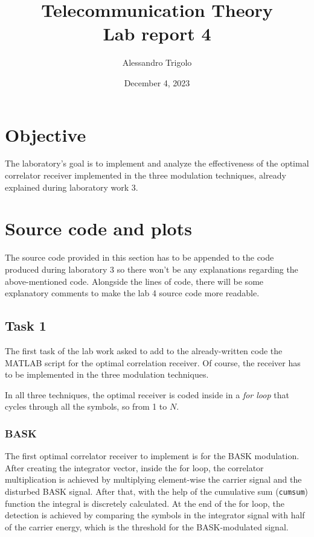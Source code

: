 \title{\vspace{160px} \textbf{\huge{Telecommunication Theory}} \\\vspace{17.5px} \LARGE{Lab report 4}  \vspace{10px}}
\author{Alessandro Trigolo}
\date{December 4, 2023}


\maketitle \newpage

\section*{Objective}
The laboratory's goal is to implement and analyze the effectiveness of the optimal correlator receiver implemented in the three modulation techniques, already explained during laboratory work 3. 

\section*{Source code and plots}
\lstset{style = MATLAB}
The source code provided in this section has to be appended to the code produced during laboratory 3 so there won't be any explanations regarding the above-mentioned code. Alongside the lines of code, there will be some explanatory comments to make the lab 4 source code more readable.

\subsection*{Task 1}
The first task of the lab work asked to add to the already-written code the MATLAB script for the optimal correlation receiver. Of course, the receiver has to be implemented in the three modulation techniques.

In all three techniques, the optimal receiver is coded inside in a \textsl{for loop} that cycles through all the symbols, so from 1 to $N$.

\subsubsection*{BASK}
The first optimal correlator receiver to implement is for the BASK modulation. After creating the integrator vector, inside the for loop, the correlator multiplication is achieved by multiplying element-wise the carrier signal and the disturbed BASK signal. After that, with the help of the cumulative sum (\texttt{cumsum}) function the integral is discretely calculated. At the end of the for loop, the detection is achieved by comparing the symbols in the integrator signal with half of the carrier energy, which is the threshold for the BASK-modulated signal.

